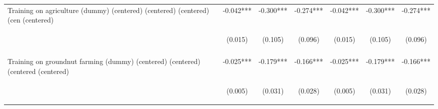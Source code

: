 \begin{center}
\begin{tabular}{lcccccc}
Training on agriculture (dummy) (centered) (centered) (centered) (cen (centered) & -0.042*** & -0.300*** & -0.274*** & -0.042*** & -0.300*** & -0.274*** \\
 & \begin{footnotesize}(0.015)\end{footnotesize} & \begin{footnotesize}(0.105)\end{footnotesize} & \begin{footnotesize}(0.096)\end{footnotesize} & \begin{footnotesize}(0.015)\end{footnotesize} & \begin{footnotesize}(0.105)\end{footnotesize} & \begin{footnotesize}(0.096)\end{footnotesize} \\
\vspace{4pt} & \begin{footnotesize}[0.006]\end{footnotesize} & \begin{footnotesize}[0.004]\end{footnotesize} & \begin{footnotesize}[0.004]\end{footnotesize} & \begin{footnotesize}[0.006]\end{footnotesize} & \begin{footnotesize}[0.004]\end{footnotesize} & \begin{footnotesize}[0.004]\end{footnotesize} \\
Training on groundnut farming (dummy) (centered) (centered) (centered (centered) & -0.025*** & -0.179*** & -0.166*** & -0.025*** & -0.179*** & -0.166*** \\
 & \begin{footnotesize}(0.005)\end{footnotesize} & \begin{footnotesize}(0.031)\end{footnotesize} & \begin{footnotesize}(0.028)\end{footnotesize} & \begin{footnotesize}(0.005)\end{footnotesize} & \begin{footnotesize}(0.031)\end{footnotesize} & \begin{footnotesize}(0.028)\end{footnotesize} \\

\end{tabular}
\end{center}
